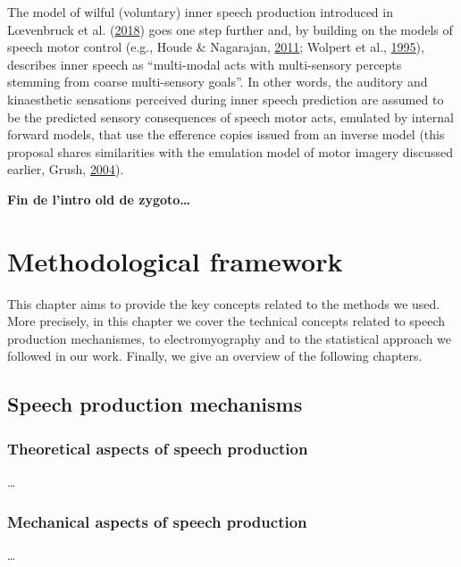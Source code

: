 \documentclass[a4paper,12pt,twoside,openright,oldfontcommands]{memoir}
\begin{document}
The model of wilful (voluntary) inner speech production introduced in
Lœvenbruck et al.
(\protect\hyperlink{ref-loevenbruck_cognitive_2018}{2018}) goes one step
further and, by building on the models of speech motor control (e.g.,
Houde \& Nagarajan, \protect\hyperlink{ref-houde_speech_2011}{2011};
Wolpert et al., \protect\hyperlink{ref-wolpert_internal_1995}{1995}),
describes inner speech as ``multi-modal acts with multi-sensory percepts
stemming from coarse multi-sensory goals''. In other words, the auditory
and kinaesthetic sensations perceived during inner speech prediction are
assumed to be the predicted sensory consequences of speech motor acts,
emulated by internal forward models, that use the efference copies
issued from an inverse model (this proposal shares similarities with the
emulation model of motor imagery discussed earlier, Grush,
\protect\hyperlink{ref-grush_emulation_2004}{2004}).

\textbf{Fin de l'intro old de zygoto\ldots{}}

\chapter{Methodological framework}\label{methodological-framework}

This chapter aims to provide the key concepts related to the methods we
used. More precisely, in this chapter we cover the technical concepts
related to speech production mechanismes, to electromyography and to the
statistical approach we followed in our work. Finally, we give an
overview of the following chapters.

\section{Speech production
mechanisms}\label{speech-production-mechanisms}

\subsection{Theoretical aspects of speech
production}\label{theoretical-aspects-of-speech-production}

\ldots{}

\subsection{Mechanical aspects of speech
production}\label{mechanical-aspects-of-speech-production}

\ldots{}
\end{document}
